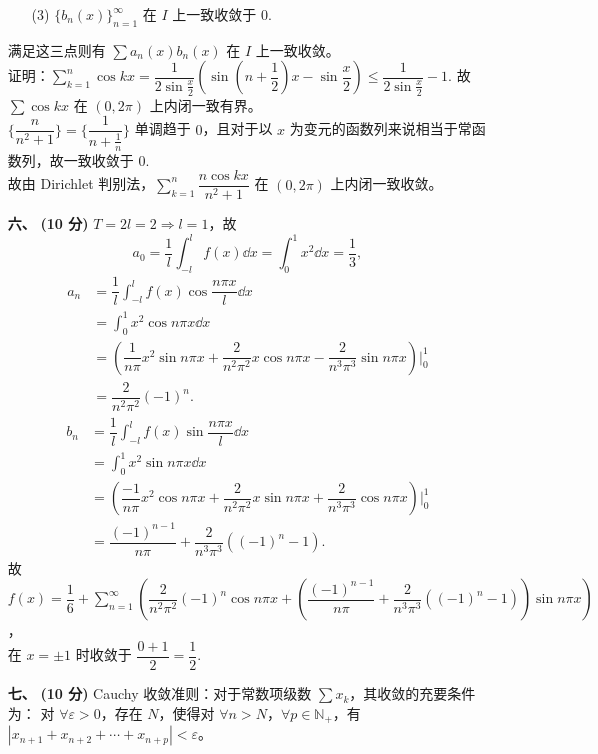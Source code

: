 \documentclass{ctexart}
\begin{document}
\begin{enumerate}
\begin{enumerate}
        \item[(3)] $\{b_n(x)\}_{n=1}^{\infty}$ 在 $I$ 上一致收敛于 $0$.  
    \end{enumerate}
    满足这三点则有 $\sum a_n(x)b_n(x)$ 在 $I$ 上一致收敛。\\
    证明：$\displaystyle\sum_{k=1}^n\cos kx=\dfrac{1}{2\sin{\frac{x}{2}}}(\sin{(n+\dfrac{1}{2})x-\sin{\dfrac{x}{2}}})\le\dfrac{1}{2\sin\frac{x}{2}}-1.$ 
    故 $\sum\cos kx$ 在 $(0,2\pi)$ 上内闭一致有界。 \\
    $\{\dfrac{n}{n^2+1}\}=\{\dfrac{1}{n+\frac{1}{n}}\}$ 单调趋于 $0$，且对于以 $x$ 为变元的函数列来说相当于常函数列，故一致收敛于 $0$.\\
    故由 Dirichlet 判别法，$\displaystyle\sum_{k=1}^n\dfrac{n\cos kx}{n^2+1}$ 在 $(0,2\pi)$ 上内闭一致收敛。\\
    \item[\textbf{六、}] \textbf{(10 分)} $T=2l=2\Rightarrow l=1$，故 $$a_0=\dfrac{1}{l}\int_{-l}^{l}f(x)\dd{x}=\int_0^1x^2\dd{x}=\dfrac{1}{3},$$
    \begin{align*}
        a_n &=\dfrac{1}{l}\int_{-l}^{l}f(x)\cos\dfrac{n\pi x}{l}\dd{x} \\
        &=\int_0^1x^2\cos{n\pi x}\dd{x} \\
        &=(\dfrac{1}{n\pi}x^2\sin{n\pi x}+\dfrac{2}{n^2\pi^2}x\cos{n\pi x}-\dfrac{2}{n^3\pi^3}\sin{n\pi x})\vert_0^1 \\
        &=\dfrac{2}{n^2\pi^2}(-1)^n.
    \end{align*}
    \begin{align*}
        b_n &=\dfrac{1}{l}\int_{-l}^{l}f(x)\sin\dfrac{n\pi x}{l}\dd{x} \\
        &=\int_0^1x^2\sin{n\pi x}\dd{x} \\
        &=(\dfrac{-1}{n\pi}x^2\cos{n\pi x}+\dfrac{2}{n^2\pi^2}x\sin{n\pi x}+\dfrac{2}{n^3\pi^3}\cos{n\pi x})\vert_0^1 \\
        &=\dfrac{(-1)^{n-1}}{n\pi}+\dfrac{2}{n^3\pi^3}((-1)^n-1).
    \end{align*}
    故 $f(x)=\dfrac{1}{6}+\displaystyle\sum_{n=1}^{\infty}(\dfrac{2}{n^2\pi^2}(-1)^n\cos{n\pi x}+(\dfrac{(-1)^{n-1}}{n\pi}+\dfrac{2}{n^3\pi^3}((-1)^n-1))\sin{n\pi x})$，\\
    在 $x=\pm 1$ 时收敛于 $\dfrac{0+1}{2}=\dfrac{1}{2}$.
    \item[\textbf{七、}] \textbf{(10 分)} Cauchy 收敛准则：对于常数项级数 $\sum x_k$，其收敛的充要条件为：
    对 $\forall \varepsilon > 0$，存在 $N$，使得对 $\forall n > N$，$\forall p \in \mathbb{N}_+$，有 $|x_{n+1} + x_{n+2} + \cdots + x_{n+p}| < \varepsilon$。\\

\end{enumerate}
\end{document}
